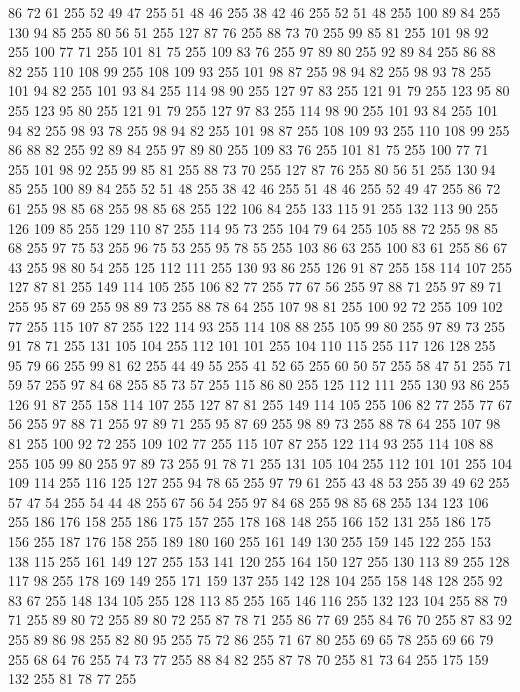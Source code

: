 86 72 61 255 52 49 47 255 51 48 46 255 38 42 46 255 52 51 48 255 100 89 84 255 130 94 85 255 80 56 51 255 127 87 76 255 88 73 70 255 99 85 81 255 101 98 92 255 100 77 71 255 101 81 75 255 109 83 76 255 97 89 80 255 92 89 84 255 86 88 82 255 110 108 99 255 108 109 93 255 101 98 87 255 98 94 82 255 98 93 78 255 101 94 82 255 101 93 84 255 114 98 90 255 127 97 83 255 121 91 79 255 123 95 80 255 123 95 80 255 121 91 79 255 127 97 83 255 114 98 90 255 101 93 84 255 101 94 82 255 98 93 78 255 98 94 82 255 101 98 87 255 108 109 93 255 110 108 99 255 86 88 82 255 92 89 84 255 97 89 80 255 109 83 76 255 101 81 75 255 100 77 71 255 101 98 92 255 99 85 81 255 88 73 70 255 127 87 76 255 80 56 51 255 130 94 85 255 100 89 84 255 52 51 48 255 38 42 46 255 51 48 46 255 52 49 47 255 86 72 61 255 98 85 68 255 98 85 68 255 122 106 84 255 133 115 91 255 132 113 90 255 126 109 85 255
129 110 87 255 114 95 73 255 104 79 64 255 105 88 72 255 98 85 68 255 97 75 53 255 96 75 53 255 95 78 55 255 103 86 63 255 100 83 61 255 86 67 43 255 98 80 54 255 125 112 111 255 130 93 86 255 126 91 87 255 158 114 107 255 127 87 81 255 149 114 105 255 106 82 77 255 77 67 56 255 97 88 71 255 97 89 71 255 95 87 69 255 98 89 73 255 88 78 64 255 107 98 81 255 100 92 72 255 109 102 77 255 115 107 87 255 122 114 93 255 114 108 88 255 105 99 80 255 97 89 73 255 91 78 71 255 131 105 104 255 112 101 101 255 104 110 115 255 117 126 128 255 95 79 66 255 99 81 62 255 44 49 55 255 41 52 65 255 60 50 57 255 58 47 51 255 71 59 57 255 97 84 68 255 85 73 57 255 115 86 80 255 125 112 111 255 130 93 86 255 126 91 87 255 158 114 107 255 127 87 81 255 149 114 105 255 106 82 77 255 77 67 56 255 97 88 71 255 97 89 71 255 95 87 69 255 98 89 73 255 88 78 64 255 107 98 81 255 100 92 72 255 109 102 77 255
115 107 87 255 122 114 93 255 114 108 88 255 105 99 80 255 97 89 73 255 91 78 71 255 131 105 104 255 112 101 101 255 104 109 114 255 116 125 127 255 94 78 65 255 97 79 61 255 43 48 53 255 39 49 62 255 57 47 54 255 54 44 48 255 67 56 54 255 97 84 68 255 98 85 68 255 134 123 106 255 186 176 158 255 186 175 157 255 178 168 148 255 166 152 131 255 186 175 156 255 187 176 158 255 189 180 160 255 161 149 130 255 159 145 122 255 153 138 115 255 161 149 127 255 153 141 120 255 164 150 127 255 130 113 89 255 128 117 98 255 178 169 149 255 171 159 137 255 142 128 104 255 158 148 128 255 92 83 67 255 148 134 105 255 128 113 85 255 165 146 116 255 132 123 104 255 88 79 71 255 89 80 72 255 89 80 72 255 87 78 71 255 86 77 69 255 84 76 70 255 87 83 92 255 89 86 98 255 82 80 95 255 75 72 86 255 71 67 80 255 69 65 78 255 69 66 79 255 68 64 76 255 74 73 77 255 88 84 82 255 87 78 70 255 81 73 64 255 175 159 132 255 81 78 77 255
